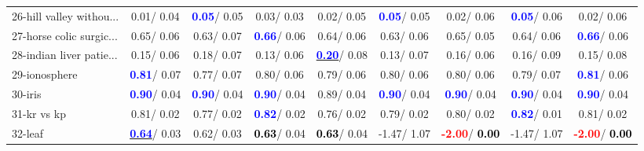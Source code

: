 \begin{table}[h]
\begin{center}
\begin{tabular}{lc|c|c|c|c|c|c|c}
26-hill valley withou... &   0.01/  0.04 & \textcolor{blue}{\textbf{  0.05}}/  0.05 &   0.03/  0.03 &   0.02/  0.05 & \textcolor{blue}{\textbf{  0.05}}/  0.05 &   0.02/  0.06 & \textcolor{blue}{\textbf{  0.05}}/  0.06 &   0.02/  0.06 \\
27-horse colic surgic... &   0.65/  0.06 &   0.63/  0.07 & \textcolor{blue}{\textbf{  0.66}}/  0.06 &   0.64/  0.06 &   0.63/  0.06 &   0.65/  0.05 &   0.64/  0.06 & \textcolor{blue}{\textbf{  0.66}}/  0.06 \\
28-indian liver patie... &   0.15/  0.06 &   0.18/  0.07 &   0.13/  0.06 & \underline{\textcolor{blue}{\textbf{  0.20}}}/  0.08 &   0.13/  0.07 &   0.16/  0.06 &   0.16/  0.09 &   0.15/  0.08 \\ \hline
29-ionosphere & \textcolor{blue}{\textbf{  0.81}}/  0.07 &   0.77/  0.07 &   0.80/  0.06 &   0.79/  0.06 &   0.80/  0.06 &   0.80/  0.06 &   0.79/  0.07 & \textcolor{blue}{\textbf{  0.81}}/  0.06 \\
30-iris & \textcolor{blue}{\textbf{  0.90}}/  0.04 & \textcolor{blue}{\textbf{  0.90}}/  0.04 & \textcolor{blue}{\textbf{  0.90}}/  0.04 &   0.89/  0.04 & \textcolor{blue}{\textbf{  0.90}}/  0.04 & \textcolor{blue}{\textbf{  0.90}}/  0.04 & \textcolor{blue}{\textbf{  0.90}}/  0.04 & \textcolor{blue}{\textbf{  0.90}}/  0.04 \\
31-kr vs kp &   0.81/  0.02 &   0.77/  0.02 & \textcolor{blue}{\textbf{  0.82}}/  0.02 &   0.76/  0.02 &   0.79/  0.02 &   0.80/  0.02 & \textcolor{blue}{\textbf{  0.82}}/  0.01 &   0.81/  0.02 \\
32-leaf & \underline{\textcolor{blue}{\textbf{  0.64}}}/  0.03 &   0.62/  0.03 & \textcolor{black}{\textbf{  0.63}}/  0.04 & \textcolor{black}{\textbf{  0.63}}/  0.04 &  -1.47/  1.07 & \textcolor{red}{\textbf{ -2.00}}/\textcolor{black}{\textbf{  0.00}} &  -1.47/  1.07 & \textcolor{red}{\textbf{ -2.00}}/\textcolor{black}{\textbf{  0.00}} \\\end{tabular}\label{stratsALCKappa0bRF}
\end{center}
\end{table}
